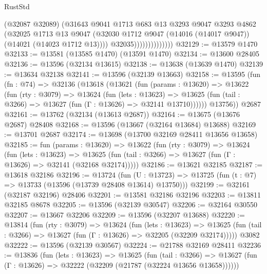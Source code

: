 \begin{lexlean}{RustStd}
\begin{coremodule}
                              (@32087 @32089)
                              (@31643
                                @9041
                                @1713
                                @683
                                @13
                                @3293
                                @9047
                                @3293
                                @4862
                                (@32025
                                  @1713
                                  @13
                                  @9047
                                  (@32030
                                    @1712
                                    @9047
                                    (@14016 (@14017 @9047))
                                    (@14021 (@14023 @1712 @13))))
                                @32035))))))))))))))
@32129 := @13579 @1470
@32133 := @13581 (@13585 @1470) (@13591 @1470)
@32134 := @13600 @28405
@32136 := @13596 (@32134 @13615)
@32138 := @13638 (@13639 @1470)
@32139 := @13634 @32138
@32141 := @13596 (@32139 @13663)
@32158 := @13595
    (fun (fn : @74) =>
    @32136
      (@13618
        (@13621
          (fun (params : @13620) =>
          @13622
            (fun (rty : @3079) =>
            @13624
              (fun (lets : @13623) =>
              @13625 (fun (tail : @3266) => @13627 (fun (Γ : @13626) => @32141 @13710))))))
        @13756))
    @2687
@32161 := @13762 (@32134 (@13613 @2687))
@32164 := @13675 (@13676 @2687) @28408
@32168 := @13596 (@13667 (@32164 @13684) @13688)
@32169 := @13701 @2687
@32174 := @13698 (@13700 @32169 @28411 @13656 @13658)
@32185 := fun (params : @13620) =>
  @13622
    (fun (rty : @3079) =>
    @13624
      (fun (lets : @13623) =>
      @13625 (fun (tail : @3266) => @13627 (fun (Γ : @13626) => @32141 (@32168 @32174)))))
@32186 := @13621 @32185
@32187 := @13618 @32186
@32196 := @13724
    (fun (U : @13723) => @13725 (fun (t : @7) => @13733 (@13596 (@13739 @28408 @13614) @13750)))
@32199 := @32161 (@32187 @32196) @28406
@32201 := @13581 @32186 @32196
@32203 := @13811 @32185 @8678
@32205 := @13596 (@32139 @30547)
@32206 := @32164 @30550
@32207 := @13667 @32206
@32209 := @13596 (@32207 @13688)
@32220 := @13814
    (fun (rty : @3079) =>
    @13624
      (fun (lets : @13623) =>
      @13625 (fun (tail : @3266) => @13627 (fun (Γ : @13626) => @32205 (@32209 @32174)))))
    @3082
@32222 := @13596 (@32139 @30567)
@32224 := @21788 @32169 @28411
@32236 := @13836
    (fun (lets : @13623) =>
    @13625
      (fun (tail : @3266) =>
      @13627 (fun (Γ : @13626) => @32222 (@32209 (@21787 (@32224 @13656 @13658))))))

\end{coremodule}
\end{lexlean}

